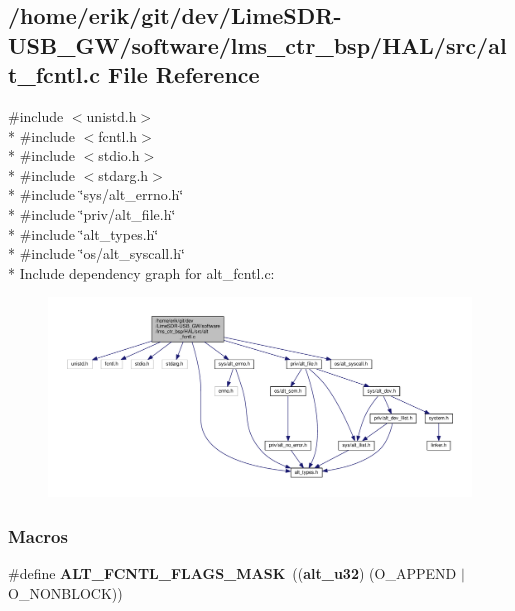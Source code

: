 \subsection{/home/erik/git/dev/\+Lime\+S\+D\+R-\/\+U\+S\+B\+\_\+\+G\+W/software/lms\+\_\+ctr\+\_\+bsp/\+H\+A\+L/src/alt\+\_\+fcntl.c File Reference}
\label{alt__fcntl_8c}
{\ttfamily \#include $<$unistd.\+h$>$}\\*
{\ttfamily \#include $<$fcntl.\+h$>$}\\*
{\ttfamily \#include $<$stdio.\+h$>$}\\*
{\ttfamily \#include $<$stdarg.\+h$>$}\\*
{\ttfamily \#include \char`\"{}sys/alt\+\_\+errno.\+h\char`\"{}}\\*
{\ttfamily \#include \char`\"{}priv/alt\+\_\+file.\+h\char`\"{}}\\*
{\ttfamily \#include \char`\"{}alt\+\_\+types.\+h\char`\"{}}\\*
{\ttfamily \#include \char`\"{}os/alt\+\_\+syscall.\+h\char`\"{}}\\*
Include dependency graph for alt\+\_\+fcntl.\+c\+:
\nopagebreak
\begin{figure}[H]
\begin{center}
\leavevmode
\includegraphics[width=350pt]{d3/d06/alt__fcntl_8c__incl}
\end{center}
\end{figure}
\subsubsection*{Macros}
\begin{DoxyCompactItemize}
\item 
\#define {\bf A\+L\+T\+\_\+\+F\+C\+N\+T\+L\+\_\+\+F\+L\+A\+G\+S\+\_\+\+M\+A\+SK}~(({\bf alt\+\_\+u32}) (O\+\_\+\+A\+P\+P\+E\+ND $\vert$ O\+\_\+\+N\+O\+N\+B\+L\+O\+CK))
\end{DoxyCompactItemize}
